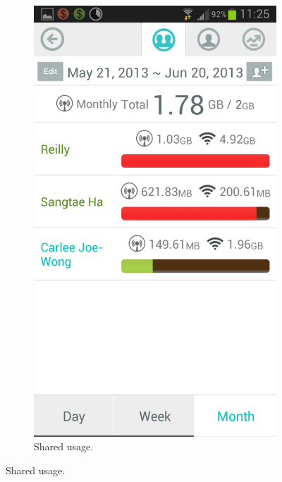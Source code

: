 \begin{figure}
\begin{subfigure}[b]{0.23\textwidth}
	\includegraphics[width = \textwidth]{Figures/Members.png}
	\caption{Shared usage.}
	\label{fig:datawiz_map2}
	\end{subfigure}
	
	\vspace{0.3in}
	

\end{figure}

